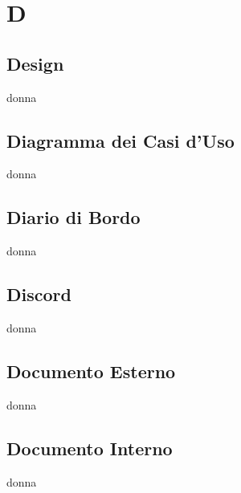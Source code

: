 \section{D} 
\subsection{Design} 
donna
\subsection{Diagramma dei Casi d'Uso} 
donna
\subsection{Diario di Bordo} 
donna
\subsection{Discord} 
donna
\subsection{Documento Esterno} 
donna
\subsection{Documento Interno} 
donna
